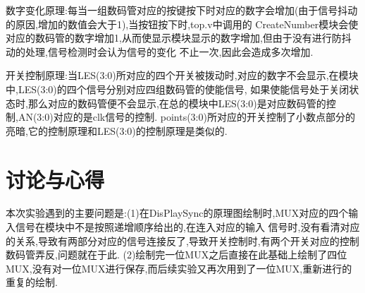 \documentclass{article}
\begin{document}
数字变化原理:每当一组数码管对应的按键按下时对应的数字会增加(由于信号抖动的原因,增加的数值会大于1),当按钮按下时,top.v中调用的
CreateNumber模块会使对应的数码管的数字增加1,从而使显示模块显示的数字增加,但由于没有进行防抖动的处理,信号检测时会认为信号的变化
不止一次,因此会造成多次增加.


开关控制原理:当LES(3:0)所对应的四个开关被拨动时,对应的数字不会显示,在模块中,LES(3:0)的四个信号分别对应四组数码管的使能信号,
如果使能信号处于关闭状态时,那么对应的数码管便不会显示,在总的模块中LES(3:0)是对应数码管的控制,AN(3:0)对应的是clk信号的控制.
points(3:0)所对应的开关控制了小数点部分的亮暗,它的控制原理和LES(3:0)的控制原理是类似的.

\section{讨论与心得}
本次实验遇到的主要问题是:(1)在DisPlaySync的原理图绘制时,MUX对应的四个输入信号在模块中不是按照递增顺序给出的,在连入对应的输入
信号时,没有看清对应的关系,导致有两部分对应的信号连接反了,导致开关控制时,有两个开关对应的控制数码管弄反,问题就在于此.
(2)绘制完一位MUX之后直接在此基础上绘制了四位MUX,没有对一位MUX进行保存,而后续实验又再次用到了一位MUX,重新进行的重复的绘制.
\end{document}
